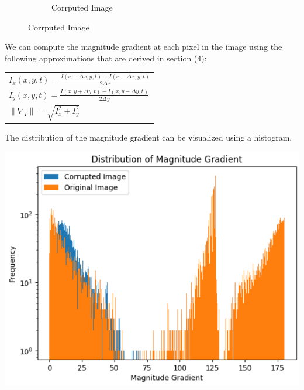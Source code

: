 \documentclass{article}
\begin{document}
\begin{figure}[!htb]
\begin{center}
\begin{subfigure}[b]{0.4\textwidth}
        \caption{Corrputed Image}
      \end{subfigure}
    \end{center}
  \end{figure}

  \noindent
  We can compute the magnitude gradient at each pixel in the image using the following
  approximations that are derived in section (4):
  \begin{center}
    \begin{tabular}{l}
      \vspace{12pt}
      $I_{x}(x,y,t) = \frac{I(x+\Delta x,y,t) - I(x-\Delta x,y,t)}{2\Delta x}$\\
      \vspace{12pt}
      $I_{y}(x,y,t) = \frac{I(x,y+\Delta y,t) - I(x,y-\Delta y,t)}{2\Delta y}$\\
      \vspace{12pt}
      $\| \nabla_{I} \| = \sqrt{I_{x}^2 + I_{y}^2}$\\
    \end{tabular}
  \end{center}

  \newpage
  \noindent
  The distribution of the magnitude gradient can be visualized using a histogram.
  \begin{center}
    \includegraphics[scale=0.5]{../report_images/gradient.png}
  \end{center}
  \vspace{12pt}
\end{document}
